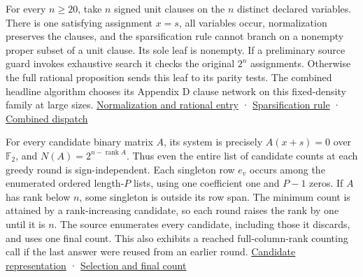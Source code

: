 \documentclass[
  11pt,
]{article}
\begin{document}
For every \(n\ge20\), take \(n\) signed unit clauses on the \(n\)
distinct declared variables. There is one satisfying assignment \(x=s\),
all variables occur, normalization preserves the clauses, and the
sparsification rule cannot branch on a nonempty proper subset of a unit
clause. Its sole leaf is nonempty. If a preliminary source guard invokes
exhaustive search it checks the original \(2^n\) assignments. Otherwise
the full rational proposition sends this leaf to its parity tests. The
combined headline algorithm chooses its Appendix D clause network on
this fixed-density family at large sizes.
\href{https://github.com/openai/math/blob/main/preprints/The-Exponential-Time-Hypothesis-is-False-October-25-2026/build/main_full_version.tex\#L3570-L3604}{Normalization
and rational entry} ·
\href{https://github.com/openai/math/blob/main/preprints/The-Exponential-Time-Hypothesis-is-False-October-25-2026/build/main_full_version.tex\#L3647-L3675}{Sparsification
rule} ·
\href{https://github.com/openai/math/blob/main/preprints/The-Exponential-Time-Hypothesis-is-False-October-25-2026/build/quantitative-reduction.tex\#L362-L369}{Combined
dispatch}

For every candidate binary matrix \(A\), its system is precisely
\(A(x+s)=0\) over \(\mathbb F_2\), and
\(N(A)=2^{n-\operatorname{rank} A}\). Thus even the entire list of
candidate counts at each greedy round is sign-independent. Each
singleton row \(e_v\) occurs among the enumerated ordered length-\(P\)
lists, using one coefficient one and \(P-1\) zeros. If \(A\) has rank
below \(n\), some singleton is outside its row span. The minimum count
is attained by a rank-increasing candidate, so each round raises the
rank by one until it is \(n\). The source enumerates every candidate,
including those it discards, and uses one final count. This also
exhibits a reached full-column-rank counting call if the last answer
were reused from an earlier round.
\href{https://github.com/openai/math/blob/main/preprints/The-Exponential-Time-Hypothesis-is-False-October-25-2026/build/main_full_version.tex\#L3446-L3466}{Candidate
representation} ·
\href{https://github.com/openai/math/blob/main/preprints/The-Exponential-Time-Hypothesis-is-False-October-25-2026/build/main_full_version.tex\#L3483-L3529}{Selection
and final count}
\end{document}
